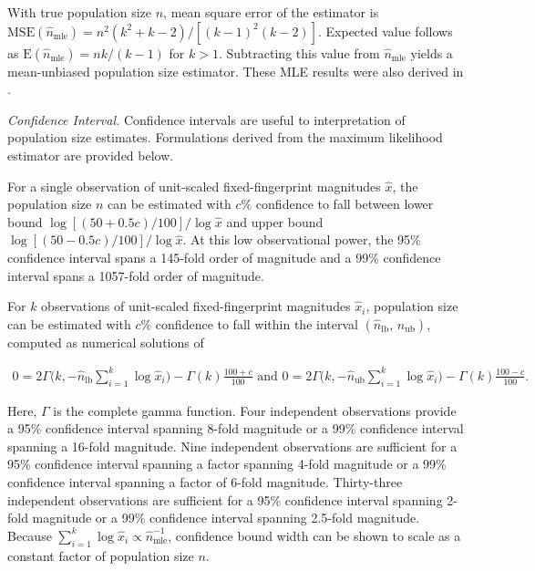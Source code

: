 With true population size $n$, mean square error of the estimator is $\mathrm{MSE}(\hat{n}_\mathrm{mle}) = n^2 (k^{2}+ k-2) / [(k-1)^{2}(k-2)]$.
Expected value follows as $\mathrm{E}(\hat{n}_\mathrm{mle}) = nk/(k-1)$ for $k>1$.
Subtracting this value from $\hat{n}_\mathrm{mle}$ yields a mean-unbiased population size estimator.
These MLE results were also derived in \citep{varagnolo2010distributed}.

\textit{Confidence Interval.}
Confidence intervals are useful to interpretation of population size estimates.
Formulations derived from the maximum likelihood estimator are provided below.

For a single observation of unit-scaled fixed-fingerprint magnitudes $\hat{x}$, the population size $n$ can be estimated with $c\%$ confidence to fall between lower bound $\log[(50+0.5c)/100] / \log\hat{x}$ and upper bound $\log[(50-0.5c)/100] / \log\hat{x}$.
At this low observational power, the 95\% confidence interval spans a 145-fold order of magnitude and a 99\% confidence interval spans a 1057-fold order of magnitude.

For $k$ observations of unit-scaled fixed-fingerprint magnitudes $\hat{x}_i$, population size can be estimated with $c\%$ confidence to fall within the interval $(\hat{n}_\mathrm{lb}, \, \hat{n}_\mathrm{ub})$, computed as numerical solutions of

\begin{footnotesize}
\begin{align}
0
= 2\Gamma\Big(k, -\hat{n}_\mathrm{lb}\sum_{i=1}^k \log\hat{x}_i\Big) - \Gamma(k)\frac{100+c}{100} \text{ and }
0
= 2\Gamma\Big(k, -\hat{n}_\mathrm{ub}\sum_{i=1}^k \log\hat{x}_i\Big) - \Gamma(k)\frac{100-c}{100}.  \label{eqn:popsize_mle_ci}
\end{align}
\end{footnotesize}

Here, $\Gamma$ is the complete gamma function.
Four independent observations provide a 95\% confidence interval spanning 8-fold magnitude or a 99\% confidence interval spanning a 16-fold magnitude.
Nine independent observations are sufficient for a 95\% confidence interval spanning a factor spanning 4-fold magnitude or a 99\% confidence interval spanning a factor of 6-fold magnitude.
Thirty-three independent observations are sufficient for a 95\% confidence interval spanning 2-fold magnitude or a 99\% confidence interval spanning 2.5-fold magnitude.
Because $\sum_{i=1}^k \log\hat{x}_i \propto \hat{n}_\mathrm{mle}^{-1}$, confidence bound width can be shown to scale as a constant factor of population size $n$.

